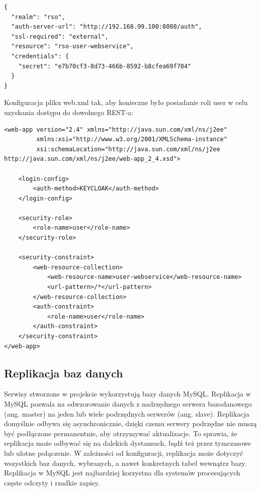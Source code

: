 \documentclass[11pt,a4paper,twoside]{article}
\begin{document}
\begin{lstlisting}
{
  "realm": "rso",
  "auth-server-url": "http://192.168.99.100:8080/auth",
  "ssl-required": "external",
  "resource": "rso-user-webservice",
  "credentials": {
    "secret": "e7b70cf3-8d73-466b-8592-b8cfea69f704"
  }
}
\end{lstlisting}
\vspace{-20pt}
Konfiguracja pliku web.xml tak, aby konieczne było posiadanie roli user w celu uzyskania dostępu do dowolnego REST-a:

\begin{lstlisting}
<web-app version="2.4" xmlns="http://java.sun.com/xml/ns/j2ee"
         xmlns:xsi="http://www.w3.org/2001/XMLSchema-instance"
         xsi:schemaLocation="http://java.sun.com/xml/ns/j2ee http://java.sun.com/xml/ns/j2ee/web-app_2_4.xsd">

    <login-config>
        <auth-method>KEYCLOAK</auth-method>
    </login-config>

    <security-role>
        <role-name>user</role-name>
    </security-role>

    <security-constraint>
        <web-resource-collection>
            <web-resource-name>user-webservice</web-resource-name>
            <url-pattern>/*</url-pattern>
        </web-resource-collection>
        <auth-constraint>
            <role-name>user</role-name>
        </auth-constraint>
    </security-constraint>
</web-app>
\end{lstlisting}
\vspace{-20pt}
\subsection{Replikacja baz danych}
Serwisy stworzone w projekcie wykorzystują bazy danych MySQL. Replikacja w MySQL pozwala na odwzorowanie danych z nadrzędnego serwera bazodanowego (ang. master) na jeden lub wiele podrzędnych serwerów (ang. slave). Replikacja domyślnie odbywa się asynchronicznie, dzięki czemu serwery podrzędne nie muszą być podłączone permanentnie, aby otrzymywać aktualizacje. To sprawia, że replikacja może odbywać się na dalekich dystansach, bądź też przez tymczasowe lub ulotne połączenie. W zależności od konfiguracji, replikacja może dotyczyć wszystkich baz danych, wybranych, a nawet konkretnych tabel wewnątrz bazy. Replikacja w MySQL jest najbardziej korzystna dla systemów procesujących częste odczyty i rzadkie zapisy.
\end{document}
